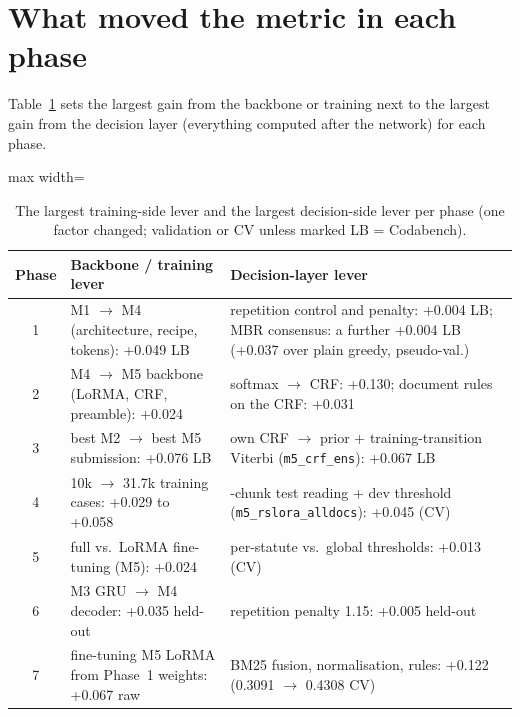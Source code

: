 \documentclass[11pt, oneside]{article}
\newcommand{\run}[1]{\texttt{#1}}
\begin{document}
\section{What moved the metric in each phase}\label{sec:results}
Table~\ref{tab:levers} sets the largest gain from the backbone or training next to the largest gain from the decision
layer (everything computed after the network) for each phase.

\begin{table}[H]
\centering\small
\caption{The largest training-side lever and the largest decision-side lever per phase (one factor changed;
validation or CV unless marked LB = Codabench).}
\label{tab:levers}
\begin{adjustbox}{max width=\textwidth}
\begin{tabular}{c>{\raggedright\arraybackslash}p{6.4cm}>{\raggedright\arraybackslash}p{6.6cm}}
\toprule
Phase & Backbone / training lever & Decision-layer lever\\
\midrule
1 & M1 $\to$ M4 (architecture, recipe, tokens): +0.049 LB & repetition control and penalty: +0.004 LB; MBR consensus: a further +0.004 LB (+0.037 over plain greedy, pseudo-val.)\\
2 & M4 $\to$ M5 backbone (LoRMA, CRF, preamble): +0.024 & softmax $\to$ CRF: +0.130; document rules on the CRF: +0.031\\
3 & best M2 $\to$ best M5 submission: +0.076 LB & own CRF $\to$ prior + training-transition Viterbi (\run{m5\_crf\_ens}): +0.067 LB\\
4 & 10k $\to$ 31.7k training cases: +0.029 to +0.058 & 8-chunk test reading + dev threshold (\run{m5\_rslora\_alldocs}): +0.045 (CV)\\
5 & full vs.\ LoRMA fine-tuning (M5): +0.024 & per-statute vs.\ global thresholds: +0.013 (CV)\\
6 & M3 GRU $\to$ M4 decoder: +0.035 held-out & repetition penalty 1.15: +0.005 held-out\\
7 & fine-tuning M5 LoRMA from Phase~1 weights: +0.067 raw & BM25 fusion, normalisation, rules: +0.122 (0.3091 $\to$ 0.4308 CV)\\
\bottomrule
\end{tabular}
\end{adjustbox}
\end{table}
\end{document}
